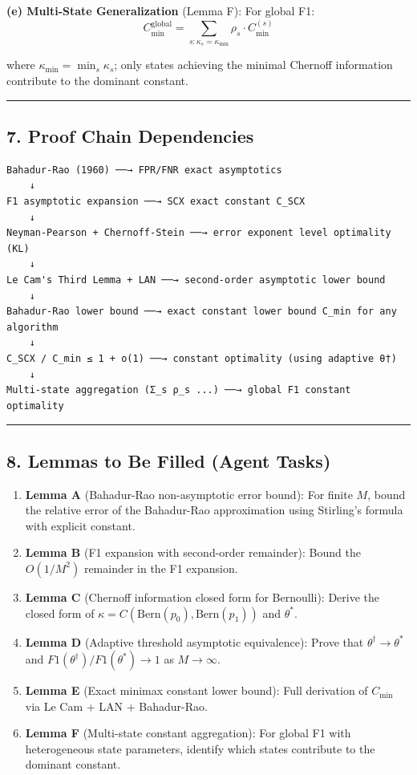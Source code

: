 \documentclass[
  12pt,
]{article}
\providecommand{\tightlist}{%
  \setlength{\itemsep}{0pt}\setlength{\parskip}{0pt}}
\begin{document}
\textbf{(e) Multi-State Generalization} (Lemma F): For global F1:
\[C_{\min}^{\text{global}} = \sum_{s: \kappa_s = \kappa_{\min}} \rho_s \cdot C_{\min}^{(s)}\]

where \(\kappa_{\min} = \min_s \kappa_s\); only states achieving the minimal Chernoff information contribute to the dominant constant.

\begin{center}\rule{0.5\linewidth}{0.5pt}\end{center}

\subsection{7. Proof Chain Dependencies}\label{proof-chain-dependencies}

\begin{verbatim}
Bahadur-Rao (1960) ──→ FPR/FNR exact asymptotics
    ↓
F1 asymptotic expansion ──→ SCX exact constant C_SCX
    ↓
Neyman-Pearson + Chernoff-Stein ──→ error exponent level optimality (KL)
    ↓
Le Cam's Third Lemma + LAN ──→ second-order asymptotic lower bound
    ↓
Bahadur-Rao lower bound ──→ exact constant lower bound C_min for any algorithm
    ↓
C_SCX / C_min ≤ 1 + o(1) ──→ constant optimality (using adaptive θ†)
    ↓
Multi-state aggregation (Σ_s ρ_s ...) ──→ global F1 constant optimality
\end{verbatim}

\begin{center}\rule{0.5\linewidth}{0.5pt}\end{center}

\subsection{8. Lemmas to Be Filled (Agent Tasks)}\label{lemmas-to-be-filled-agent-tasks}

\begin{enumerate}
\def\labelenumi{\arabic{enumi}.}
\tightlist
\item
  \textbf{Lemma A} (Bahadur-Rao non-asymptotic error bound): For finite \(M\), bound the relative error of the Bahadur-Rao approximation using Stirling's formula with explicit constant.
\item
  \textbf{Lemma B} (F1 expansion with second-order remainder): Bound the \(O(1/M^2)\) remainder in the F1 expansion.
\item
  \textbf{Lemma C} (Chernoff information closed form for Bernoulli): Derive the closed form of \(\kappa = C(\text{Bern}(p_0), \text{Bern}(p_1))\) and \(\theta^*\).
\item
  \textbf{Lemma D} (Adaptive threshold asymptotic equivalence): Prove that \(\theta^\dagger \to \theta^*\) and \(F1(\theta^\dagger)/F1(\theta^*) \to 1\) as \(M \to \infty\).
\item
  \textbf{Lemma E} (Exact minimax constant lower bound): Full derivation of \(C_{\min}\) via Le Cam + LAN + Bahadur-Rao.
\item
  \textbf{Lemma F} (Multi-state constant aggregation): For global F1 with heterogeneous state parameters, identify which states contribute to the dominant constant.
\end{enumerate}
\end{document}
